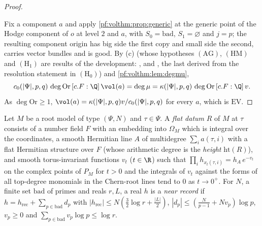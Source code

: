 \begin{proof}
\begin{enumerate}[label=(\alph*)]
\end{enumerate}
Fix a component $a$ and apply \cref{pf:volthm:prop:generic} at the generic point of the Hodge component of $o$ at
level $2$ and $a$, with $S_0=\mathrm{bad}$, $S_1=\varnothing$ and $j=p$; the resulting component origin has big side
the first copy and small side the second, carries vector bundles and is good. By (c) (whose hypotheses $(\mathrm{AG})$,
$(\mathrm{HM})$ and $(\mathrm{H}_1)$ are results of the development: ,
 and
, the last derived from the resolution statement in
$(\mathrm{H}_0)$) and \cref{pf:volthm:lem:degmu},
\[
c_0(|\Psi|,p,q)\,\deg\mathrm{Or}\,[c.F:\Q]\,\vol(a)=\deg\mu=\kappa(|\Psi|,p,q)\,\deg\mathrm{Or}\,[c.F:\Q]\,v .
\]
As $\deg\mathrm{Or}\ge1$, $\vol(a)=\kappa(|\Psi|,p,q)v/c_0(|\Psi|,p,q)$ for every $a$, which is $\mathrm{EV}$.
\end{proof}

\begin{definition}\label{pf:volthm:def:flat}
Let $M$ be a root model of type $(\Psi,N)$ and $\tau\in\Psi$. A \emph{flat datum} $R$ of $M$ at $\tau$ consists of a
number field $F$ with an embedding into $\Omega_M$ which is integral over the coordinates, a smooth Hermitian line
$A$ of multidegree $\sum_ia(\tau,i)$ with a flat Hermitian structure over $F$ (whose arithmetic degree is the
\emph{height} $\mathrm{ht}(R)$), and smooth torus-invariant functions $v_t$ ($t\in\R$) such that
$\prod_ih_{x_t(\tau,i)}=h_A\,e^{-v_t}$ on the complex points of $P_M$ for $t>0$ and the integrals of $v_t$ against the
forms of all top-degree monomials in the Chern-root lines tend to $0$ as $t\to0^+$. For $N$, a finite set $\mathrm{bad}$
of primes and reals $r,L$, a real $h$ is a \emph{near record} if $h=h_{\mathrm{rec}}+\sum_{p\in\mathrm{bad}}d_p$ with
$|h_{\mathrm{rec}}|\le N(\frac32\log r+\frac{|L|}2)$, $|d_p|\le(\frac N{p-1}+Nv_p)\log p$, $v_p\ge0$ and
$\sum_{p\in\mathrm{bad}}v_p\log p\le\log r$.
\end{definition}

